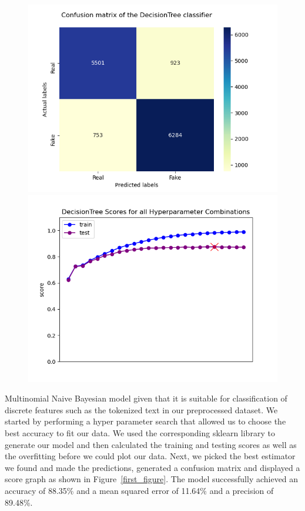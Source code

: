 \documentclass[10pt,twocolumn,letterpaper]{article}
\begin{document}
\begin{figure}[h]
   \begin{center}
        \includegraphics[width=\linewidth]{Latex_Report/report/Graphs/DT/confusion_matrix.png}
        \includegraphics[width=\linewidth]{Latex_Report/report/Graphs/DT/scores_plot.png}
   \end{center}
        \vspace*{-8mm}
        \caption{\label{second_figure}}
\end{figure}

Multinomial Naive Bayesian model given that it is suitable for classification of discrete features such as the tokenized text in our preprocessed dataset. We started by performing a hyper parameter search that allowed us to choose the best accuracy to fit our data. We used the corresponding sklearn library to generate our model and then calculated the training and testing scores as well as the overfitting before we could plot our data. Next, we picked the best estimator we found and made the predictions, generated a confusion matrix and displayed a score graph as shown in Figure~\ref{first_figure}. The model successfully achieved an accuracy of 88.35\% and a mean squared error of 11.64\% and a precision of 89.48\%. 
\end{document}
